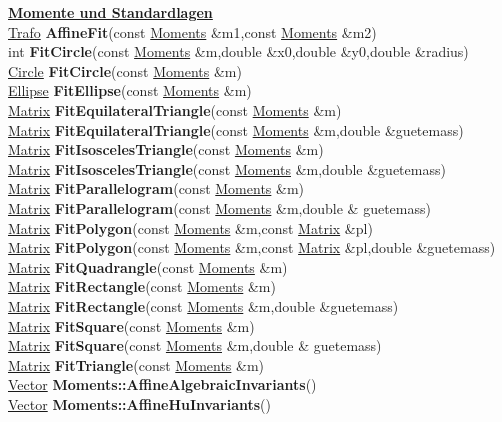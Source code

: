 \documentclass[10pt,titlepage]{article}
\newcommand{\subtitle}[1]{{\noindent\bf#1}}
\def\functionlistentry#1#2#3#4#5#6{\noindent #1 {\bf #2}(#3) \dotfill #6\\}
\begin{document}
{{\subtitle{\hyperlink{SECTION:moments}{Momente und Standardlagen}}\\
\functionlistentry{\hyperlink{Trafo}{Trafo}}{AffineFit}{const \hyperlink{Moments}{Moments} \&m1,const \hyperlink{Moments}{Moments} \&m2}{839}{moments}{}
\functionlistentry{int}{FitCircle}{const \hyperlink{Moments}{Moments} \&m,double \&x0,double \&y0,double \&radius}{854}{moments}{}
\functionlistentry{\hyperlink{Circle}{Circle}}{FitCircle}{const \hyperlink{Moments}{Moments} \&m}{855}{moments}{}
\functionlistentry{\hyperlink{Ellipse}{Ellipse}}{FitEllipse}{const \hyperlink{Moments}{Moments} \&m}{856}{moments}{}
\functionlistentry{\hyperlink{Matrix}{Matrix}}{FitEquilateralTriangle}{const \hyperlink{Moments}{Moments} \&m}{841}{moments}{}
\functionlistentry{\hyperlink{Matrix}{Matrix}}{FitEquilateralTriangle}{const \hyperlink{Moments}{Moments} \&m,double \&guetemass}{842}{moments}{}
\functionlistentry{\hyperlink{Matrix}{Matrix}}{FitIsoscelesTriangle}{const \hyperlink{Moments}{Moments} \&m}{843}{moments}{}
\functionlistentry{\hyperlink{Matrix}{Matrix}}{FitIsoscelesTriangle}{const \hyperlink{Moments}{Moments} \&m,double \&guetemass}{844}{moments}{}
\functionlistentry{\hyperlink{Matrix}{Matrix}}{FitParallelogram}{const \hyperlink{Moments}{Moments} \&m}{849}{moments}{}
\functionlistentry{\hyperlink{Matrix}{Matrix}}{FitParallelogram}{const \hyperlink{Moments}{Moments} \&m,double \& guetemass}{850}{moments}{}
\functionlistentry{\hyperlink{Matrix}{Matrix}}{FitPolygon}{const \hyperlink{Moments}{Moments} \&m,const \hyperlink{Matrix}{Matrix} \&pl}{852}{moments}{}
\functionlistentry{\hyperlink{Matrix}{Matrix}}{FitPolygon}{const \hyperlink{Moments}{Moments} \&m,const \hyperlink{Matrix}{Matrix} \&pl,double \&guetemass}{853}{moments}{}
\functionlistentry{\hyperlink{Matrix}{Matrix}}{FitQuadrangle}{const \hyperlink{Moments}{Moments} \&m}{851}{moments}{}
\functionlistentry{\hyperlink{Matrix}{Matrix}}{FitRectangle}{const \hyperlink{Moments}{Moments} \&m}{847}{moments}{}
\functionlistentry{\hyperlink{Matrix}{Matrix}}{FitRectangle}{const \hyperlink{Moments}{Moments} \&m,double \&guetemass}{848}{moments}{}
\functionlistentry{\hyperlink{Matrix}{Matrix}}{FitSquare}{const \hyperlink{Moments}{Moments} \&m}{845}{moments}{}
\functionlistentry{\hyperlink{Matrix}{Matrix}}{FitSquare}{const \hyperlink{Moments}{Moments} \&m,double \& guetemass}{846}{moments}{}
\functionlistentry{\hyperlink{Matrix}{Matrix}}{FitTriangle}{const \hyperlink{Moments}{Moments} \&m}{840}{moments}{}
\functionlistentry{\hyperlink{Vector}{Vector}}{Moments::AffineAlgebraicInvariants}{}{821}{moments}{}
\functionlistentry{\hyperlink{Vector}{Vector}}{Moments::AffineHuInvariants}{}{823}{moments}{}
}}
\end{document}
